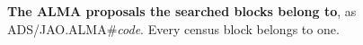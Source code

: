 \begin{table}
\centering
\scriptsize
\caption{\textbf{The \NProjCodes{} ALMA proposals the searched blocks belong
to}, as \mbox{ADS/JAO.ALMA\#\textit{code}}. Every census block belongs to
one.\ProjCodeUnresClause}
\label{tab:projcodes}

\end{table}
